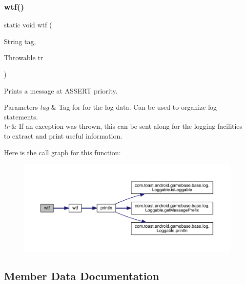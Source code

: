 \subsubsection{\texorpdfstring{wtf()}{wtf()}\hspace{0.1cm}{\footnotesize\ttfamily [3/3]}}
{\footnotesize\ttfamily static void wtf (\begin{DoxyParamCaption}\item[{String}]{tag,  }\item[{Throwable}]{tr }\end{DoxyParamCaption})\hspace{0.3cm}{\ttfamily [static]}}



Prints a message at A\+S\+S\+E\+RT priority. 


\begin{DoxyParams}{Parameters}
{\em tag} & Tag for for the log data. Can be used to organize log statements. \\
\hline
{\em tr} & If an exception was thrown, this can be sent along for the logging facilities to extract and print useful information. \\
\hline
\end{DoxyParams}
Here is the call graph for this function\+:
\nopagebreak
\begin{figure}[H]
\begin{center}
\leavevmode
\includegraphics[width=350pt]{classcom_1_1toast_1_1android_1_1gamebase_1_1base_1_1log_1_1_logger_a3c834156048f909cd14a6244c0732fae_cgraph}
\end{center}
\end{figure}


\subsection{Member Data Documentation}
\mbox{\label{classcom_1_1toast_1_1android_1_1gamebase_1_1base_1_1log_1_1_logger_a3d462acb7f869e29b976cfd5015c2a82}} 

